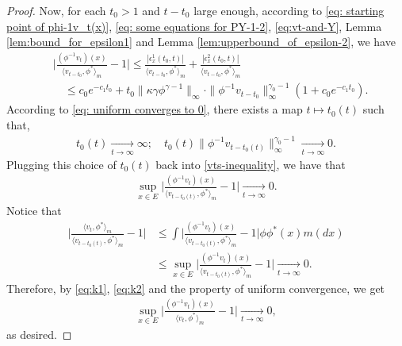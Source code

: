 \documentclass[12pt,a4paper]{amsart}
\theoremstyle{definition}
\numberwithin{equation}{section}
\begin{document}
\begin{proof}
Now, for each $t_0 > 1$ and $t-t_0$ large enough, according to \eqref{eq: starting point of phi-1v_t(x)}, \eqref{eq: some equations for PY-1-2}, \eqref{eq:vt-and-Y},  Lemma \ref{lem:bound_for_epsilon1} and Lemma \ref{lem:upperbound_of_epsilon-2}, we have
\begin{align} \label{vts-inequality}
	&\Big|\frac{(\phi^{-1}v_t)(x)}{\langle v_{t-t_0},\phi^* \rangle_m}-1 \Big|
   \leq \frac{|\epsilon_x^1(t_0,t)|}{\langle v_{t-t_0},\phi^* \rangle_m} + \frac{|\epsilon_x^2(t_0,t)|}{\langle v_{t-t_0},\phi^* \rangle_m}\\
     & \quad \leq c_0e^{-c_1 t_0} +t_0\|\kappa\gamma\phi^{\gamma - 1}\|_{\infty}
       \cdot \|\phi^{-1}v_{t-t_0}\|^{\gamma_0-1}_\infty (1+c_0 e^{-c_1 t_0}).
\end{align}
According to \eqref{eq: uniform converges to 0}, there exists a map $t\mapsto t_0(t)$ such that,
\begin{align}
	t_0(t)
	\xrightarrow[t\to\infty]{} \infty;
	\quad t_0(t)\| \phi^{-1}v_{t-t_0(t)}\|^{\gamma_0 - 1}_\infty
	\xrightarrow[t\to\infty]{} 0.
\end{align}
Plugging this choice of $t_0(t)$ back into \eqref{vts-inequality}, we have that
\begin{align}\label{eq:k1}
	\sup_{x\in E}\Big|\frac{(\phi^{-1}v_t)(x)}{\langle v_{t-t_0(t)},\phi^* \rangle_m}-1 \Big|
	\xrightarrow[t\to\infty]{} 0.
\end{align}
Notice that
\begin{align}\label{eq:k2}
	\Big |\frac {\langle v_t, \phi^*\rangle_m} {\langle v_{t-t_0(t)} , \phi^*\rangle_m} - 1 \Big |
    & \leq \int \Big | \frac{(\phi^{-1}v_t)(x)}{\langle v_{t-t_0(t)} , \phi^*\rangle_m} - 1 \Big| \phi \phi^*(x) m(dx)\\
    & \leq \sup_{x\in E}\Big|\frac{(\phi^{-1}v_t)(x)}{\langle v_{t-t_0(t)},\phi^* \rangle_m}-1 \Big|
      \xrightarrow[t\to\infty]{} 0.
\end{align}
Therefore, by \eqref{eq:k1}, \eqref{eq:k2} and the property of uniform convergence, we get
\begin{align}
	\sup_{x\in E}\Big|\frac{(\phi^{-1}v_t)(x)}{\langle v_{t},\phi^* \rangle_m}-1 \Big|
	\xrightarrow[t\to\infty]{} 0,
\end{align}
as desired.
\end{proof}
\end{document}
